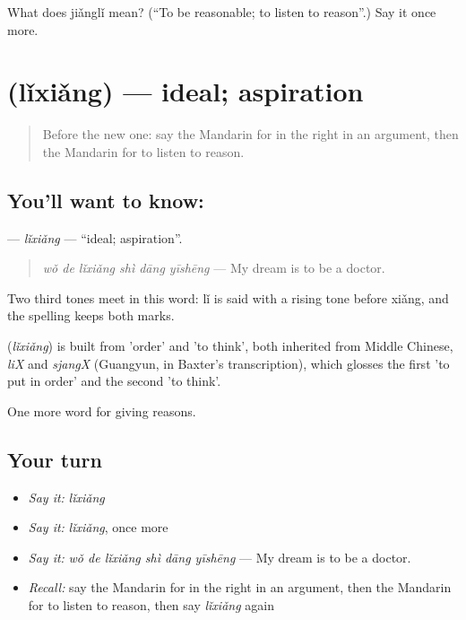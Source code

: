 \begin{tcolorbox}[breakable,colback=teal!4,colframe=teal!35!black,title={Before you move on}]
What does jiǎnglǐ mean? (\textquotedblleft{}To be reasonable; to listen to reason\textquotedblright{}.) Say it once more.
\end{tcolorbox}
\section[\texorpdfstring{\zh{理想} (lǐxiǎng)}{理想 (lǐxiǎng)}]{ (lǐxiǎng) — ideal; aspiration}

\label{lesson:ZH-C351-lixiang}



\begin{quote}
Before the new one: say the Mandarin for in the right in an argument, then the Mandarin for to listen to reason.
\end{quote}

\subsection*{You'll want to know: }
\textbf{} — \emph{lǐxiǎng} — \textquotedblleft{}ideal; aspiration\textquotedblright{}.

\begin{quote}
\textbf{} \emph{wǒ de lǐxiǎng shì dāng yīshēng} — My dream is to be a doctor.
\end{quote}

Two third tones meet in this word: lǐ is said with a rising tone before xiǎng, and the spelling keeps both marks.

\begin{cousinweb}
\textbf{} (\emph{lǐxiǎng}) is built from  'order' and  'to think', both inherited from Middle Chinese, \emph{liX} and \emph{sjangX} (Guangyun, in Baxter's transcription), which glosses the first 'to put in order' and the second 'to think'.
\end{cousinweb}

\begin{grammarlens}[title={What you've built}]
One more word for giving reasons.
\end{grammarlens}

\subsection*{Your turn}
\begin{itemize}
\raggedright
  \item \emph{Say it:} \emph{lǐxiǎng}
  \item \emph{Say it:} \emph{lǐxiǎng}, once more
  \item \emph{Say it:} \emph{wǒ de lǐxiǎng shì dāng yīshēng} — My dream is to be a doctor.
  \item \emph{Recall:} say the Mandarin for in the right in an argument, then the Mandarin for to listen to reason, then say \emph{lǐxiǎng} again
\end{itemize}

